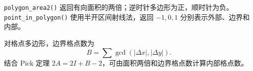 \texttt{polygon\_area2()} 返回有向面积的两倍；逆时针多边形为正，顺时针为负。
\texttt{point\_in\_polygon()} 使用半开区间射线法，返回 \(-1,0,1\) 分别表示外部、边界和内部。

对格点多边形，边界格点数为
\[
  B=\sum\gcd(|\Delta x|,|\Delta y|).
\]
结合 Pick 定理 \(2A=2I+B-2\)，可由面积两倍和边界格点数计算内部格点数。
